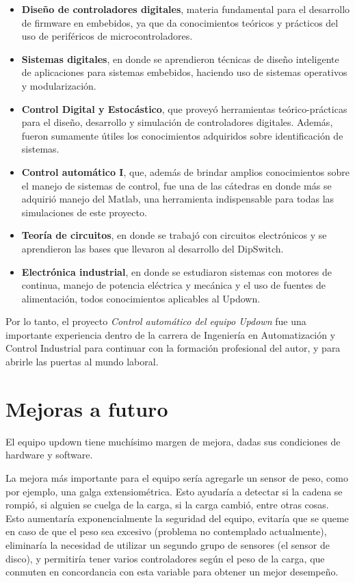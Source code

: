 \begin{itemize}
	\item \textbf{Diseño de controladores digitales}, materia fundamental para el desarrollo de firmware en embebidos, ya que da conocimientos teóricos y prácticos del uso de periféricos de microcontroladores. 
	\item \textbf{Sistemas digitales}, en donde se aprendieron técnicas de diseño inteligente de aplicaciones para sistemas embebidos, haciendo uso de sistemas operativos y modularización.	
	\item \textbf{Control Digital y Estocástico}, que proveyó herramientas teórico-prácticas para el diseño, desarrollo y simulación de controladores digitales. Además, fueron sumamente útiles los conocimientos adquiridos sobre identificación de sistemas.
	\item \textbf{Control automático I}, que, además de brindar amplios conocimientos sobre el manejo de sistemas de control, fue una de las cátedras en donde más se adquirió manejo del Matlab, una herramienta indispensable para todas las simulaciones de este proyecto.
	\item \textbf{Teoría de circuitos}, en donde se trabajó con circuitos electrónicos y se aprendieron las bases que llevaron al desarrollo del DipSwitch.
	\item \textbf{Electrónica industrial}, en donde se estudiaron sistemas con motores de continua, manejo de potencia eléctrica y mecánica y el uso de fuentes de alimentación, todos conocimientos aplicables al Updown.
\end{itemize}

Por lo tanto, el proyecto \textit{Control automático del equipo Updown} fue una importante experiencia dentro de la carrera de Ingeniería en Automatización y Control Industrial para continuar con la formación profesional del autor, y para abrirle las puertas al mundo laboral. 
 
\section{Mejoras a futuro} \label{sec:\thesection}

El equipo updown tiene muchísimo margen de mejora, dadas sus condiciones de hardware y software. 

La mejora más importante para el equipo sería agregarle un sensor de peso, como por ejemplo, una galga extensiométrica. Esto ayudaría a detectar si la cadena se rompió, si alguien se cuelga de la carga, si la carga cambió, entre otras cosas. Esto aumentaría exponencialmente la seguridad del equipo, evitaría que se queme en caso de que el peso sea excesivo (problema no contemplado actualmente), eliminaría la necesidad de utilizar un segundo grupo de sensores (el sensor de disco), y permitiría tener varios controladores según el peso de la carga, que conmuten en concordancia con esta variable para obtener un mejor desempeño.

